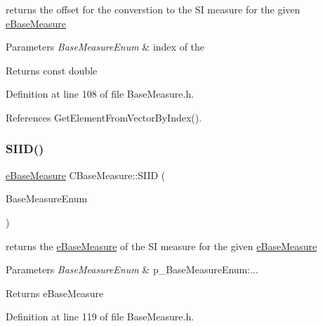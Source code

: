returns the offset for the converstion to the SI measure for the given \hyperlink{BaseMeasure_8h_ac90e5164ccf1f0d648fba7e94b229a11}{e\+Base\+Measure} 


\begin{DoxyParams}{Parameters}
{\em Base\+Measure\+Enum} & index of the \\
\hline
\end{DoxyParams}
\begin{DoxyReturn}{Returns}
const double 
\end{DoxyReturn}


Definition at line 108 of file Base\+Measure.\+h.



References Get\+Element\+From\+Vector\+By\+Index().

\mbox{\label{classCBaseMeasure_a4a2040454722a288e24babbacef30d01}} 
\subsubsection{\texorpdfstring{S\+I\+I\+D()}{SIID()}}
{\footnotesize\ttfamily \hyperlink{BaseMeasure_8h_ac90e5164ccf1f0d648fba7e94b229a11}{e\+Base\+Measure} C\+Base\+Measure\+::\+S\+I\+ID (\begin{DoxyParamCaption}\item[{const \hyperlink{BaseMeasure_8h_ac90e5164ccf1f0d648fba7e94b229a11}{e\+Base\+Measure}}]{Base\+Measure\+Enum }\end{DoxyParamCaption})\hspace{0.3cm}{\ttfamily [inline]}}



returns the \hyperlink{BaseMeasure_8h_ac90e5164ccf1f0d648fba7e94b229a11}{e\+Base\+Measure} of the SI measure for the given \hyperlink{BaseMeasure_8h_ac90e5164ccf1f0d648fba7e94b229a11}{e\+Base\+Measure} 


\begin{DoxyParams}{Parameters}
{\em Base\+Measure\+Enum} & p\+\_\+\+Base\+Measure\+Enum\+:... \\
\hline
\end{DoxyParams}
\begin{DoxyReturn}{Returns}
e\+Base\+Measure 
\end{DoxyReturn}


Definition at line 119 of file Base\+Measure.\+h.



